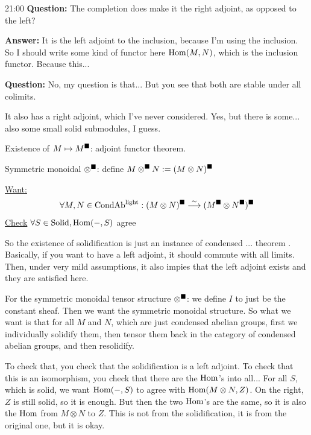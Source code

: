 \begin{unfinished}{21:00}
\textbf{Question:} The completion does make it the right adjoint, as opposed to the left? 

\textbf{Answer:} It is the left adjoint to the inclusion, because I'm using the inclusion. So I should write some kind of functor here $\operatorname{Hom}(M,N)$, which is the inclusion functor. Because this... 

\textbf{Question:} No, my question is that... But you see that both are stable under all colimits. 

It also has a right adjoint, which I've never considered. Yes, but there is some... also some small solid submodules, I guess.


\begin{sketch}
Existence of $M \mapsto M^\blacksquare$: adjoint functor theorem.

Symmetric monoidal $\otimes^\blacksquare$: define $M \otimes^\blacksquare N := (M \otimes N)^\blacksquare$

\underline{Want:} 
\begin{align*}
\forall M, N \in \mathrm{Cond}\mathrm{Ab}^{\mathrm{light}}: (M \otimes N)^\blacksquare \overset\sim\longrightarrow (M^\blacksquare \otimes N^\blacksquare)^\blacksquare
\end{align*}
\underline{Check} $\forall S \in \mathrm{Solid}, \operatorname{Hom}(-,S)$ agree
\end{sketch}


So the existence of solidification is just an instance of condensed ... theorem . Basically, if you want to have a left adjoint, it should commute with all limits. Then, under very mild assumptions, it also impies that the left adjoint exists and they are satisfied here.

For the symmetric monoidal tensor structure $\otimes^\blacksquare$: we define $I$ to just be the constant sheaf. Then we want the symmetric monoidal structure. So what we want is that for all $M$ and $N$, which are just condensed abelian groups, first we individually solidify them, then tensor them back in the category of condensed abelian groups, and then resolidify.

To check that, you check that the solidification is a left adjoint. 
To check that this is an isomorphism, you check that there are the $\operatorname{Hom}$'s into all... For all $S$, which is solid, we want $\operatorname{Hom}(-,S)$ to agree with $\operatorname{Hom}(M\otimes N, Z)$. On the right, $Z$ is still solid, so it is enough. But then the two $\operatorname{Hom}$'s are the same, so it is also the $\operatorname{Hom}$ from $M \otimes N$ to $Z$. This is not from the solidification, it is from the original one, but it is okay.


\end{unfinished}
